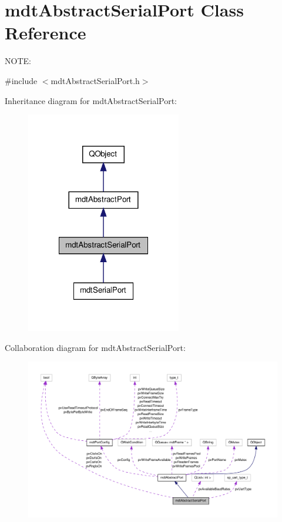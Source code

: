 \hypertarget{classmdt_abstract_serial_port}{\section{mdt\-Abstract\-Serial\-Port Class Reference}
\label{classmdt_abstract_serial_port}
}


N\-O\-T\-E\-:  




{\ttfamily \#include $<$mdt\-Abstract\-Serial\-Port.\-h$>$}



Inheritance diagram for mdt\-Abstract\-Serial\-Port\-:
\nopagebreak
\begin{figure}[H]
\begin{center}
\leavevmode
\includegraphics[width=192pt]{classmdt_abstract_serial_port__inherit__graph}
\end{center}
\end{figure}


Collaboration diagram for mdt\-Abstract\-Serial\-Port\-:
\nopagebreak
\begin{figure}[H]
\begin{center}
\leavevmode
\includegraphics[width=350pt]{classmdt_abstract_serial_port__coll__graph}
\end{center}
\end{figure}
